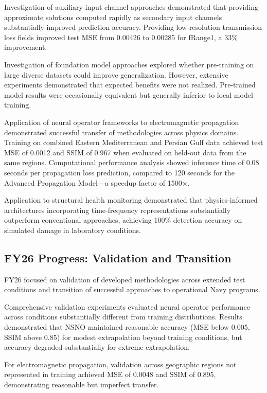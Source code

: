 \documentclass{article}
\begin{document}
Investigation of auxiliary input channel approaches demonstrated that providing approximate solutions computed rapidly as secondary input channels substantially improved prediction accuracy. Providing low-resolution transmission loss fields improved test MSE from 0.00426 to 0.00285 for fRange1, a 33\% improvement.

Investigation of foundation model approaches explored whether pre-training on large diverse datasets could improve generalization. However, extensive experiments demonstrated that expected benefits were not realized. Pre-trained model results were occasionally equivalent but generally inferior to local model training.

Application of neural operator frameworks to electromagnetic propagation demonstrated successful transfer of methodologies across physics domains. Training on combined Eastern Mediterranean and Persian Gulf data achieved test MSE of 0.0012 and SSIM of 0.967 when evaluated on held-out data from the same regions. Computational performance analysis showed inference time of 0.08 seconds per propagation loss prediction, compared to 120 seconds for the Advanced Propagation Model—a speedup factor of 1500×.

Application to structural health monitoring demonstrated that physics-informed architectures incorporating time-frequency representations substantially outperform conventional approaches, achieving 100\% detection accuracy on simulated damage in laboratory conditions.

\subsection{FY26 Progress: Validation and Transition}

FY26 focused on validation of developed methodologies across extended test conditions and transition of successful approaches to operational Navy programs.

Comprehensive validation experiments evaluated neural operator performance across conditions substantially different from training distributions. Results demonstrated that NSNO maintained reasonable accuracy (MSE below 0.005, SSIM above 0.85) for modest extrapolation beyond training conditions, but accuracy degraded substantially for extreme extrapolation.

For electromagnetic propagation, validation across geographic regions not represented in training achieved MSE of 0.0048 and SSIM of 0.895, demonstrating reasonable but imperfect transfer.
\end{document}
